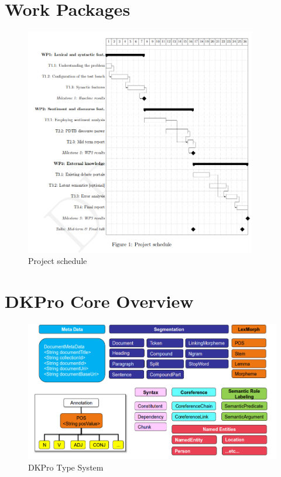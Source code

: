 \chapter{Work Packages}
\label{sec:schedule}
\begin{figure}[H]
    \centering
    \includegraphics[width=0.9\textwidth]{fig/schedule.png}
    \caption[Short caption]{Project schedule}
    \label{fig:schedule}
\end{figure}
\chapter{DKPro Core Overview}
\begin{figure}[ht]
    \centering
    \includegraphics[width=1\textwidth]{fig/dkpro-overview.png}
    \caption[Short caption]{DKPro Type System}
    \label{fig:dkpro-overview}
\end{figure}
\label{sec:dkpro overview}

